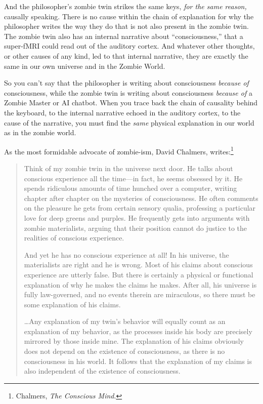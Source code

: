 {
 And the philosopher's zombie twin strikes the same
keys, \textit{for the same reason,} causally speaking. There is no
cause within the chain of explanation for why the philosopher writes
the way they do that is not also present in the zombie twin. The zombie
twin also has an internal narrative about
``consciousness,'' that a super-fMRI
could read out of the auditory cortex. And whatever other thoughts, or
other causes of any kind, led to that internal narrative, they are
exactly the same in our own universe and in the Zombie World.}

{
 So you can't say that the philosopher is writing
about consciousness \textit{because of} consciousness, while the zombie
twin is writing about consciousness \textit{because of} a Zombie Master
or AI chatbot. When you trace back the chain of causality behind the
keyboard, to the internal narrative echoed in the auditory cortex, to
the cause of the narrative, you must find the \textit{same} physical
explanation in our world as in the zombie world.}

{
 As the most formidable advocate of zombie-ism, David Chalmers,
writes:\footnote{Chalmers, \textit{The Conscious Mind}.}}

\begin{quotation}
{
 Think of my zombie twin in the universe next door. He talks about
conscious experience all the time---in fact, he seems obsessed by it.
He spends ridiculous amounts of time hunched over a computer, writing
chapter after chapter on the mysteries of consciousness. He often
comments on the pleasure he gets from certain sensory qualia,
professing a particular love for deep greens and purples. He frequently
gets into arguments with zombie materialists, arguing that their
position cannot do justice to the realities of conscious experience.}

{
 And yet he has no conscious experience at all! In his universe,
the materialists are right and he is wrong. Most of his claims about
conscious experience are utterly false. But there is certainly a
physical or functional explanation of why he makes the claims he makes.
After all, his universe is fully law-governed, and no events therein
are miraculous, so there must be some explanation of his claims.}

{
 \ldots Any explanation of my twin's behavior will
equally count as an explanation of my behavior, as the processes inside
his body are precisely mirrored by those inside mine. The explanation
of his claims obviously does not depend on the existence of
consciousness, as there is no consciousness in his world. It follows
that the explanation of my claims is also independent of the existence
of consciousness.}
\end{quotation}


